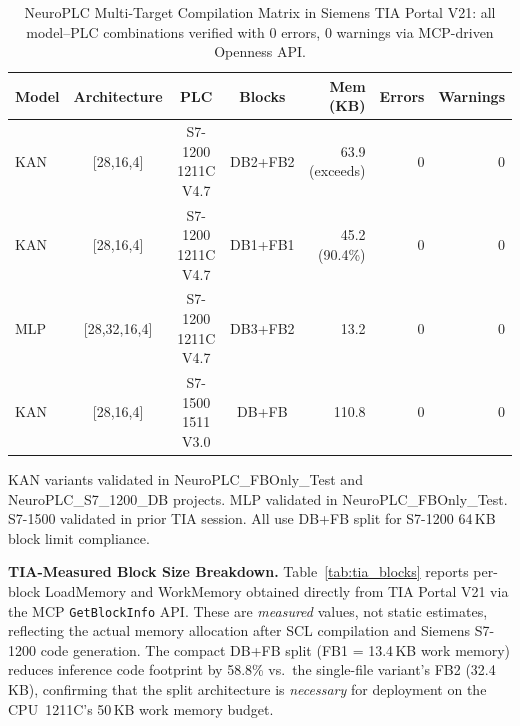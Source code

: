 \documentclass[journal,onecolumn]{IEEEtran}
\begin{document}
\begin{table}[tb]
\centering
\caption{NeuroPLC Multi-Target Compilation Matrix in Siemens TIA Portal V21:
all model--PLC combinations verified with 0 errors, 0 warnings via
MCP-driven Openness API.}
\label{tab:tia_multitarget}
\footnotesize
\begin{tabular}{@{}lcccrrr@{}}
\toprule
\textbf{Model} & \textbf{Architecture} & \textbf{PLC} &
\textbf{Blocks} & \textbf{Mem (KB)} & \textbf{Errors} & \textbf{Warnings} \\
\midrule
KAN & [28,16,4] & S7-1200 1211C V4.7 & DB2+FB2 & 63.9 (exceeds) & 0 & 0 \\
KAN & [28,16,4] & S7-1200 1211C V4.7 & DB1+FB1 & 45.2 (90.4\%) & 0 & 0 \\
MLP & [28,32,16,4] & S7-1200 1211C V4.7 & DB3+FB2 & 13.2 & 0 & 0 \\
KAN & [28,16,4] & S7-1500 1511 V3.0 & DB+FB & 110.8 & 0 & 0 \\
\bottomrule
\end{tabular}
\vspace{2pt}
{\scriptsize KAN variants validated in NeuroPLC\_FBOnly\_Test and
NeuroPLC\_S7\_1200\_DB projects. MLP validated in NeuroPLC\_FBOnly\_Test.
S7-1500 validated in prior TIA session. All use DB+FB split for
S7-1200 64\,KB block limit compliance.}
\end{table}


\vspace{4pt}
\noindent\textbf{TIA-Measured Block Size Breakdown.}
Table~\ref{tab:tia_blocks} reports per-block LoadMemory and WorkMemory
obtained directly from TIA Portal V21 via the MCP \texttt{GetBlockInfo} API.
These are \textit{measured} values, not static estimates, reflecting the
actual memory allocation after SCL compilation and Siemens S7-1200 code
generation. The compact DB+FB split (FB1 = 13.4\,KB work memory) reduces
inference code footprint by 58.8\% vs.\ the single-file variant's FB2
(32.4\,KB), confirming that the split architecture is \textit{necessary}
for deployment on the CPU~1211C's 50\,KB work memory budget.
\end{document}
